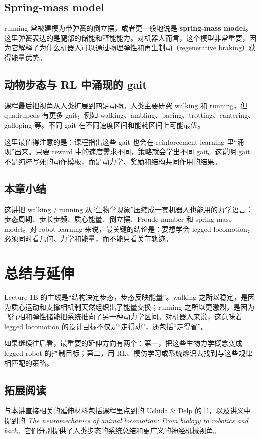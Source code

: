 \documentclass[a4paper]{article}
\begin{document}
\subsection{Spring-mass model}
running 常被建模为带弹簧的倒立摆，或者更一般地说是 \textbf{spring-mass model}。这里弹簧表达的是腿部的储能和释能能力。对机器人而言，这个模型非常重要，因为它解释了为什么机器人可以通过物理弹性和再生制动（regenerative braking）获得能量优势。

\subsection{动物步态与 RL 中涌现的 gait}
课程最后把视角从人类扩展到四足动物。人类主要研究 walking 和 running，但 quadrupeds 有更多 gait，例如 walking、ambling、pacing、trotting、cantering、galloping 等。不同 gait 在不同速度区间和能耗区间上可能最优。

这里最值得注意的是：课程指出这些 gait 也会在 reinforcement learning 里“涌现”出来。只要 reward 中的速度需求不同，策略就会学出不同 gait。这说明 gait 不是纯粹写死的动作模板，而是动力学、奖励和结构共同作用的结果。

\subsection{本章小结}
这讲把 walking / running 从“生物学现象”压缩成一套机器人也能用的力学语言：步态周期、步长步频、质心能量、倒立摆、Froude number 和 spring-mass model。对 robot learning 来说，最关键的结论是：要想学会 legged locomotion，必须同时看几何、力学和能量，而不能只看关节轨迹。

\section{总结与延伸}
Lecture 1B 的主线是“结构决定步态，步态反映能量”。walking 之所以稳定，是因为质心运动和支撑相机制天然组织出了能量交换；running 之所以更激烈，是因为飞行相和弹性储能把系统推向了另一种动力学区间。对机器人来说，这意味着 legged locomotion 的设计目标不仅是“走得动”，还包括“走得省”。

如果继续往后看，最重要的延伸方向有两个：第一，把这些生物力学概念变成 legged robot 的控制目标；第二，用 RL、模仿学习或系统辨识去找到与这些规律相匹配的策略。

\subsection{拓展阅读}
与本讲直接相关的延伸材料包括课程里点到的 Uchida \& Delp 的书，以及讲义中提到的 \emph{The neuromechanics of animal locomotion: From biology to robotics and back}。它们分别提供了人类步态的系统总结和更广义的神经机械视角。
\end{document}
